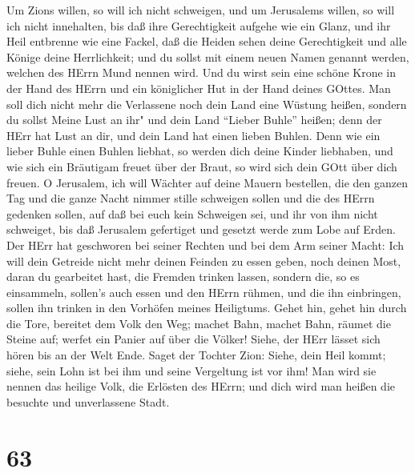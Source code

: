  Um Zions willen, so will ich nicht schweigen, und um
Jerusalems willen, so will ich nicht innehalten, bis daß ihre
Gerechtigkeit aufgehe wie ein Glanz, und ihr Heil entbrenne wie eine
Fackel,  daß die Heiden sehen deine Gerechtigkeit und alle
Könige deine Herrlichkeit; und du sollst mit einem neuen Namen genannt
werden, welchen des HErrn Mund nennen wird.  Und du wirst
sein eine schöne Krone in der Hand des HErrn und ein königlicher Hut in
der Hand deines GOttes.  Man soll dich nicht mehr die
Verlassene noch dein Land eine Wüstung heißen, sondern du sollst Meine
Lust an ihr" und dein Land ``Lieber Buhle'' heißen; denn der HErr hat
Lust an dir, und dein Land hat einen lieben Buhlen.  Denn
wie ein lieber Buhle einen Buhlen liebhat, so werden dich deine Kinder
liebhaben, und wie sich ein Bräutigam freuet über der Braut, so wird
sich dein GOtt über dich freuen.  O Jerusalem, ich will
Wächter auf deine Mauern bestellen, die den ganzen Tag und die ganze
Nacht nimmer stille schweigen sollen und die des HErrn gedenken sollen,
auf daß bei euch kein Schweigen sei,  und ihr von ihm nicht
schweiget, bis daß Jerusalem gefertiget und gesetzt werde zum Lobe auf
Erden.  Der HErr hat geschworen bei seiner Rechten und bei
dem Arm seiner Macht: Ich will dein Getreide nicht mehr deinen Feinden
zu essen geben, noch deinen Most, daran du gearbeitet hast, die Fremden
trinken lassen,  sondern die, so es einsammeln, sollen's
auch essen und den HErrn rühmen, und die ihn einbringen, sollen ihn
trinken in den Vorhöfen meines Heiligtums.  Gehet hin,
gehet hin durch die Tore, bereitet dem Volk den Weg; machet Bahn, machet
Bahn, räumet die Steine auf; werfet ein Panier auf über die Völker!
 Siehe, der HErr lässet sich hören bis an der Welt Ende.
Saget der Tochter Zion: Siehe, dein Heil kommt; siehe, sein Lohn ist bei
ihm und seine Vergeltung ist vor ihm!  Man wird sie nennen
das heilige Volk, die Erlösten des HErrn; und dich wird man heißen die
besuchte und unverlassene Stadt.

\hypertarget{section-62}{%
\section{63}\label{section-62}}

